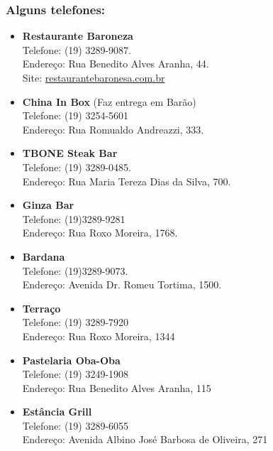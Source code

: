 \subsubsection{Alguns telefones:}

\begin{itemize}
\item   \textbf{Restaurante Baroneza}
        \\Telefone: (19) 3289-9087.
        \\Endereço: Rua Benedito Alves Aranha, 44.
        \\Site: \url{restaurantebaronesa.com.br}

\item   \textbf{China In Box} (Faz entrega em Barão)
        \\Telefone: (19) 3254-5601
        \\Endereço: Rua Romualdo Andreazzi, 333.

\item   \textbf{TBONE Steak Bar}
        \\Telefone: (19) 3289-0485.
        \\Endereço: Rua Maria Tereza Dias da Silva, 700.

\item   \textbf{Ginza Bar}
        \\Telefone: (19)3289-9281
        \\Endereço: Rua Roxo Moreira, 1768.

\item   \textbf{Bardana}
        \\Telefone: (19)3289-9073.
        \\Endereço: Avenida Dr. Romeu Tortima, 1500.

\item   \textbf{Terraço}
        \\Telefone: (19) 3289-7920
        \\Endereço: Rua Roxo Moreira, 1344

\item   \textbf{Pastelaria Oba-Oba}
        \\Telefone: (19) 3249-1908
        \\Endereço: Rua Benedito Alves Aranha, 115

\item   \textbf{Estância Grill}
        \\Telefone: (19) 3289-6055
        \\Endereço: Avenida Albino José Barbosa de Oliveira, 271


\end{itemize}
